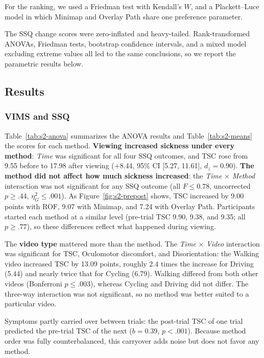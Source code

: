 For the ranking, we used a Friedman test with Kendall's $W$, and a
Plackett--Luce model in which Minimap and Overlay Path share one preference
parameter.

The SSQ change scores were zero-inflated and heavy-tailed. Rank-transformed
ANOVAs, Friedman tests, bootstrap confidence intervals, and a mixed model
excluding extreme values all led to the same conclusions, so we report the
parametric results below.

\subsection{Results}

\subsubsection{VIMS and SSQ}

Table~\ref{tab:s2-anova} summarizes the ANOVA results and
Table~\ref{tab:s2-means} the scores for each method. \textbf{Viewing increased
sickness under every method}: \textit{Time} was significant for all four SSQ
outcomes, and TSC rose from 9.55 before to 17.98 after viewing (+8.44, 95\% CI
[5.27, 11.61], $d_z = 0.90$). \textbf{The method did not affect how much
sickness increased}: the \textit{Time} $\times$ \textit{Method} interaction was
not significant for any SSQ outcome (all $F \le 0.78$, uncorrected
$p \ge .44$, $\eta^2_G \le .001$). As Figure~\ref{fig:s2-prepost} shows, TSC
increased by 9.00 points with ROF, 9.07 with Minimap, and 7.24 with Overlay
Path. Participants started each method at a similar level (pre-trial TSC 9.90,
9.38, and 9.35; all $p \ge .77$), so these differences reflect what happened
during viewing.

The \textbf{video type} mattered more than the method. The \textit{Time}
$\times$ \textit{Video} interaction was significant for TSC, Oculomotor
discomfort, and Disorientation: the Walking video increased TSC by 13.09
points, roughly 2.4 times the increase for Driving (5.44) and nearly twice that
for Cycling (6.79). Walking differed from both other videos (Bonferroni
$p \le .003$), whereas Cycling and Driving did not differ. The three-way
interaction was not significant, so no method was better suited to a
particular video.

Symptoms partly carried over between trials: the post-trial TSC of one trial
predicted the pre-trial TSC of the next ($b = 0.39$, $p < .001$). Because
method order was fully counterbalanced, this carryover adds noise but does not
favor any method.

